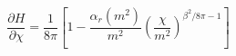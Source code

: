 \begin{equation}
\frac{\partial H}{\partial \chi} = \frac{1}{8 \pi} [1-
\frac{\alpha_r(m^2)}{m^2}
(\frac{\chi}{m^2})^{\beta^2/8 \pi -1}]
\end{equation}


